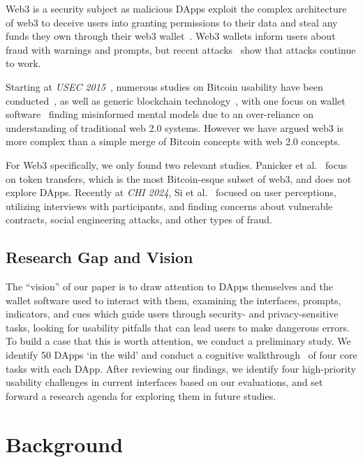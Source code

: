 \documentclass[conference]{IEEEtran}
\begin{document}
Web3 is a security subject as malicious DApps exploit the complex architecture of web3 to deceive users into granting permissions to their data and steal any funds they own through their web3 wallet~\cite{si2024understanding,torres2023your}.
Web3 wallets inform users about fraud with warnings and prompts, but recent attacks~\cite{toulas2024lottiefiles,vismaya2024pepe,zmudzinski2024Eigenlayer} show that attacks continue to work.

Starting at \textit{USEC 2015}~\cite{eskandari2018first}, numerous studies on Bitcoin usability have been conducted~\cite{eskandari2018first,gao2016of,krombholz2017the,mai2020user,sas2017design}, as well as generic blockchain technology~\cite{frohlich2022blockchain,jang2022userExperience,jang2020userPerspectives}, with one focus on wallet software~\cite{voskobojnikov2021u} finding misinformed mental models due to an over-reliance on understanding of traditional web 2.0 systems. However we have argued web3 is more complex than a simple merge of Bitcoin concepts with web 2.0 concepts.

For Web3 specifically, we only found two relevant studies. Panicker et al.~\cite{panicker2024end} focus on token transfers, which is the most Bitcoin-esque subset of web3, and does not explore DApps. Recently at \textit{CHI 2024}, Si et al.~\cite{si2024understanding} focused on user perceptions, utilizing interviews with participants, and finding concerns about vulnerable contracts, social engineering attacks, and other types of fraud.

\subsection{Research Gap and Vision}

The ``vision'' of our paper is to draw attention to DApps themselves and the wallet software used to interact with them, examining the interfaces, prompts, indicators, and cues which guide users through security- and privacy-sensitive tasks, looking for usability pitfalls that can lead users to make dangerous errors. To build a case that this is worth attention, we conduct a preliminary study. We identify 50 DApps `in the wild' and conduct a cognitive walkthrough~\cite{wharton1994cognitive} of four core tasks with each DApp. After reviewing our findings, we identify four high-priority usability challenges in current interfaces based on our evaluations, and set forward a research agenda for exploring them in future studies. 

\section{Background}
\end{document}
